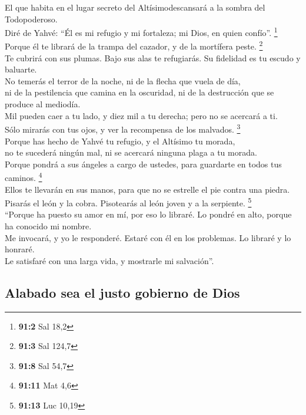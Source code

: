  El que habita en el lugar secreto del Altísimodescansará
a la sombra del Todopoderoso.\\
 Diré de Yahvé: ``Él es mi refugio y mi fortaleza; mi
Dios, en quien confío''. \footnote{\textbf{91:2} Sal 18,2}\\
 Porque él te librará de la trampa del cazador, y de la
mortífera peste. \footnote{\textbf{91:3} Sal 124,7}\\
 Te cubrirá con sus plumas. Bajo sus alas te refugiarás.
Su fidelidad es tu escudo y baluarte.\\
 No temerás el terror de la noche, ni de la flecha que
vuela de día,\\
 ni de la pestilencia que camina en la oscuridad, ni de la
destrucción que se produce al mediodía.\\
 Mil pueden caer a tu lado, y diez mil a tu derecha; pero
no se acercará a ti.\\
 Sólo mirarás con tus ojos, y ver la recompensa de los
malvados. \footnote{\textbf{91:8} Sal 54,7}\\
 Porque has hecho de Yahvé tu refugio, y el Altísimo tu
morada,\\
 no te sucederá ningún mal, ni se acercará ninguna plaga
a tu morada.\\
 Porque pondrá a sus ángeles a cargo de ustedes, para
guardarte en todos tus caminos. \footnote{\textbf{91:11} Mat 4,6}\\
 Ellos te llevarán en sus manos, para que no se estrelle
el pie contra una piedra.\\
 Pisarás el león y la cobra. Pisotearás al león joven y a
la serpiente. \footnote{\textbf{91:13} Luc 10,19}\\
 ``Porque ha puesto su amor en mí, por eso lo libraré. Lo
pondré en alto, porque ha conocido mi nombre.\\
 Me invocará, y yo le responderé. Estaré con él en los
problemas. Lo libraré y lo honraré.\\
 Le satisfaré con una larga vida, y mostrarle mi
salvación''.

\hypertarget{alabado-sea-el-justo-gobierno-de-dios}{%
\subsection{Alabado sea el justo gobierno de
Dios}\label{alabado-sea-el-justo-gobierno-de-dios}}

